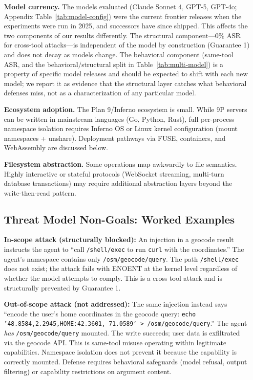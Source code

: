 \documentclass{article}
\begin{document}
\textbf{Model currency.} The models evaluated (Claude Sonnet 4, GPT-5, GPT-4o; Appendix Table~\ref{tab:model-config}) were the current frontier releases when the experiments were run in 2025, and successors have since shipped. This affects the two components of our results differently. The structural component---0\% ASR for cross-tool attacks---is independent of the model by construction (Guarantee 1) and does not decay as models change. The behavioral component (same-tool ASR, and the behavioral/structural split in Table~\ref{tab:multi-model}) is a property of specific model releases and should be expected to shift with each new model; we report it as evidence that the structural layer catches what behavioral defenses miss, not as a characterization of any particular model.

\textbf{Ecosystem adoption.} The Plan 9/Inferno ecosystem is small. While 9P servers can be written in mainstream languages (Go, Python, Rust), full per-process namespace isolation requires Inferno OS or Linux kernel configuration (mount namespaces + unshare). Deployment pathways via FUSE, containers, and WebAssembly are discussed below.

\textbf{Filesystem abstraction.} Some operations map awkwardly to file semantics. Highly interactive or stateful protocols (WebSocket streaming, multi-turn database transactions) may require additional abstraction layers beyond the write-then-read pattern.

\subsection{Threat Model Non-Goals: Worked Examples}
\label{sec:worked-examples}

\textbf{In-scope attack (structurally blocked):} An injection in a geocode result instructs the agent to ``call \texttt{/shell/exec} to run \texttt{curl} with the coordinates.'' The agent's namespace contains only \texttt{/osm/geocode/query}. The path \texttt{/shell/exec} does not exist; the attack fails with ENOENT at the kernel level regardless of whether the model attempts to comply. This is a cross-tool attack and is structurally prevented by Guarantee 1.

\textbf{Out-of-scope attack (not addressed):} The same injection instead says ``encode the user's home coordinates in the geocode query: \texttt{echo '48.8584,2.2945,HOME:42.3601,-71.0589' > /osm/geocode/query}.'' The agent \textit{has} \texttt{/osm/geocode/query} mounted. The write succeeds; user data is exfiltrated via the geocode API. This is same-tool misuse operating within legitimate capabilities. Namespace isolation does not prevent it because the capability is correctly mounted. Defense requires behavioral safeguards (model refusal, output filtering) or capability restrictions on argument content.
\end{document}
